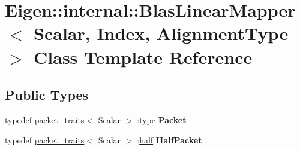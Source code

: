 \hypertarget{class_eigen_1_1internal_1_1_blas_linear_mapper}{}\section{Eigen\+::internal\+::Blas\+Linear\+Mapper$<$ Scalar, Index, Alignment\+Type $>$ Class Template Reference}
\label{class_eigen_1_1internal_1_1_blas_linear_mapper}
\subsection*{Public Types}
\begin{DoxyCompactItemize}
\item 
\mbox{\label{class_eigen_1_1internal_1_1_blas_linear_mapper_a2da71f30432ab284eb782baaf9e77b9a}} 
typedef \mbox{\hyperlink{struct_eigen_1_1internal_1_1packet__traits}{packet\+\_\+traits}}$<$ Scalar $>$\+::type {\bfseries Packet}
\item 
\mbox{\label{class_eigen_1_1internal_1_1_blas_linear_mapper_ab6cc925c0e7b005f5b0cfd435b37c09d}} 
typedef \mbox{\hyperlink{struct_eigen_1_1internal_1_1packet__traits}{packet\+\_\+traits}}$<$ Scalar $>$\+::\mbox{\hyperlink{struct_eigen_1_1half}{half}} {\bfseries Half\+Packet}
\end{DoxyCompactItemize}
